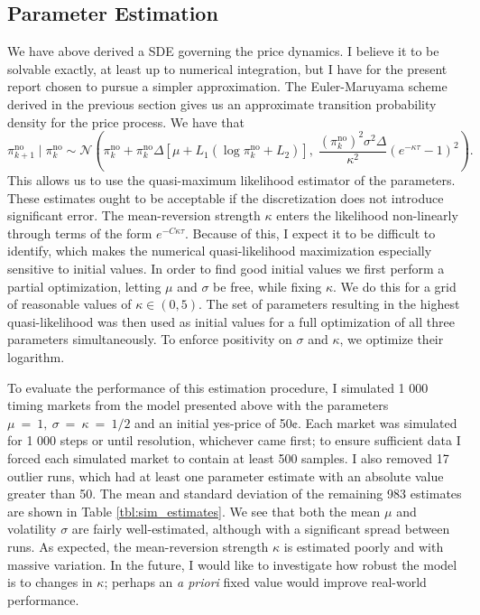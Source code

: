 \documentclass[a4paper, 12pt]{article}
\begin{document}
\subsection{Parameter Estimation}
We have above derived a SDE governing the price dynamics. I believe it to be solvable exactly, at least up to numerical integration, but I have for the present report chosen to pursue a simpler approximation. The Euler-Maruyama scheme derived in the previous section gives us an approximate transition probability density for the price process. We have that
\begin{equation*}
\pi^{\text{no}}_{k+1}\mid \pi^{\text{no}}_k \sim 
\mathcal{N}\!\left(
\pi^{\text{no}}_k
+ \pi^{\text{no}}_k \Delta
\left[\mu + L_1\!\left(\log \pi^{\text{no}}_k + L_2\right)\right],
\;
\frac{(\pi^{\text{no}}_k)^2 \sigma^2 \Delta}{\kappa^2}
\left(e^{-\kappa \tau}-1\right)^2
\right).
\end{equation*}
This allows us to use the quasi-maximum likelihood estimator of the parameters. These estimates ought to be acceptable if the discretization does not introduce significant error. The mean-reversion strength \(\kappa\) enters the likelihood non-linearly through terms of the form \(e^{-C\kappa\tau}\). Because of this, I expect it to be difficult to identify, which makes the numerical quasi-likelihood maximization especially sensitive to initial values. In order to find good initial values we first perform a partial optimization, letting \(\mu\) and \(\sigma\) be free, while fixing \(\kappa\). We do this for a grid of reasonable values of \(\kappa \in (0, 5)\). The set of parameters resulting in the highest quasi-likelihood was then used as initial values for a full optimization of all three parameters simultaneously. To enforce positivity on \(\sigma\) and \(\kappa\), we optimize their logarithm.

To evaluate the performance of this estimation procedure, I simulated 1 000 timing markets from the model presented above with the parameters \(\mu~=~1,~\sigma~=~\kappa~=~1/2\) and an initial yes-price of 50¢. Each market was simulated for 1 000 steps or until resolution, whichever came first; to ensure sufficient data I forced each simulated market to contain at least 500 samples. I also removed 17 outlier runs, which had at least one parameter estimate with an absolute value greater than 50. The mean and standard deviation of the remaining 983 estimates are shown in Table \ref{tbl:sim_estimates}. We see that both the mean $\mu$ and volatility $\sigma$ are fairly well-estimated, although with a significant spread between runs. As expected, the mean-reversion strength $\kappa$ is estimated poorly and with massive variation. In the future, I would like to investigate how robust the model is to changes in $\kappa$; perhaps an \textit{a priori} fixed value would improve real-world performance.
\end{document}
